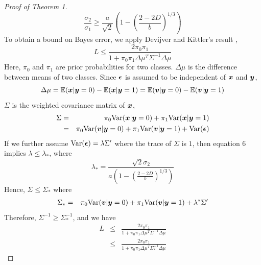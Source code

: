 \documentclass{article}
\begin{document}
\begin{proof}[Proof of Theorem 1]
\begin{equation}
	\frac{ \sigma_2}{\sigma_1} \geq\frac{a}{\sqrt{2}} (1-(\frac{2-2D}{b})^{1/3} )
	\end{equation}	
	To obtain a bound on Bayes error, we apply Devijver and Kittler's result \cite{devijver1982pattern},
	\[L \leq \frac{2\pi_0\pi_1}{1+\pi_0\pi_1\Delta\mu^T\Sigma^{-1}\Delta\mu}\]
	Here, $\pi_0$ and $\pi_1$ are prior probabilities for two classes. $\Delta\mu$ is the difference between means of two classes. Since $\boldsymbol{\epsilon}$ is assumed to be independent of $\boldsymbol{x}$ and $\boldsymbol{y}$,
	\[\Delta\mu= \mathbb{E}(\boldsymbol{x}|\boldsymbol{y}=0)-\mathbb{E}(\boldsymbol{x}|\boldsymbol{y}=1)=\mathbb{E}(\boldsymbol{v}|\boldsymbol{y}=0)-\mathbb{E}(\boldsymbol{v}|\boldsymbol{y}=1)\]
	$\Sigma$ is the weighted covariance matrix of $\boldsymbol{x}$,
	\begin{eqnarray*}
		\Sigma &=& \pi_0\text{Var}(\boldsymbol{x}|\boldsymbol{y}=0)+\pi_1\text{Var}(\boldsymbol{x}|\boldsymbol{y}=1)\\
		&=& \pi_0\text{Var}(\boldsymbol{v}|\boldsymbol{y}=0)+\pi_1\text{Var}(\boldsymbol{v}|\boldsymbol{y}=1)+\text{Var}(\boldsymbol{\epsilon}) \\ 
	\end{eqnarray*}
	If we further assume $\text{Var}(\boldsymbol{\epsilon}) = \lambda \Sigma'$ where the trace of $\Sigma$ is $1$, then equation 6 implies $\lambda\leq\lambda_*$, where
	\[\lambda_*=\frac{\sqrt{2}\sigma_2}{a(1-(\frac{2-2D}{b})^{1/3} )}\]
	Hence, 	$\Sigma \leq \Sigma_*$ where
	\begin{eqnarray*}
		\Sigma_*&=& \pi_0\text{Var}(\boldsymbol{v}|\boldsymbol{y}=0)+\pi_1\text{Var}(\boldsymbol{v}|\boldsymbol{y}=1)+\lambda^*\Sigma'
	\end{eqnarray*}
	Therefore, $\Sigma^{-1} \geq \Sigma_*^{-1}$, and we have
	\begin{eqnarray*}
		L &\leq& \frac{2\pi_0\pi_1}{1+\pi_0\pi_1\Delta\mu^T\Sigma^{-1}\Delta\mu} \\
		&\leq& \frac{2\pi_0\pi_1}{1+\pi_0\pi_1\Delta\mu^T\Sigma_*^{-1}\Delta\mu}
	\end{eqnarray*}
\end{proof}
\end{document}
